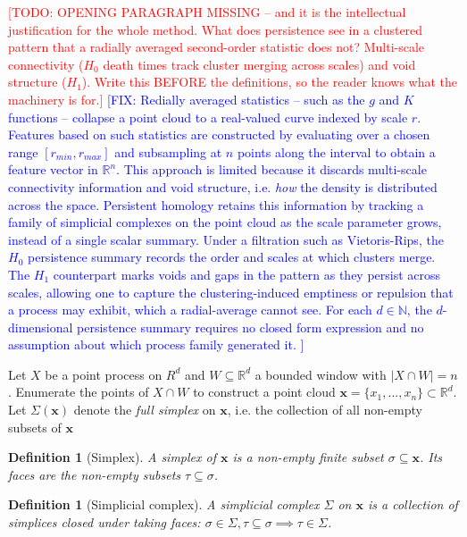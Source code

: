 \documentclass[11pt,letterpaper]{article}
\newcommand{\R}{\mathbb{R}}
\newcommand{\N}{\mathbb{N}}
\newcommand{\1}{\mathds{1}}
\newcommand{\pc}{\mathbf{x}}
\newcommand{\simpcom}{\Sigma}
\newcommand{\todo}[1]{\textcolor{red}{[TODO: #1]}}
\newcommand{\fix}[1]{\textcolor{blue}{[FIX: #1]}}
\newcommand{\todo}[1]{}
\newcommand{\fix}[1]{}
\theoremstyle{plain}
\theoremstyle{definitioncolon}
\newtheorem{definition}[theorem]{Definition}
\begin{document}
\todo{OPENING PARAGRAPH MISSING -- and it is the intellectual justification for
the whole method. What does persistence see in a clustered pattern that a
radially averaged second-order statistic does not? Multi-scale connectivity
($H_0$ death times track cluster merging across scales) and void structure
($H_1$). Write this BEFORE the definitions, so the reader knows what the
machinery is for.}
\fix{Redially averaged statistics -- such as the $g$ and $K$ functions -- collapse
a point cloud to a real-valued curve indexed by scale $r$. Features based on such
statistics are constructed by evaluating over a chosen range $[r_{min}, r_{max}]$
and subsampling at $n$ points along the interval to obtain a feature vector in $\R^n$.
This approach is limited because it discards multi-scale connectivity information and
void structure, i.e. \emph{how} the density is distributed across the space.
Persistent homology retains this information by tracking a family of simplicial
complexes on the point cloud as the scale parameter grows, instead of a single scalar
summary. Under a filtration such as Vietoris-Rips, the $H_0$ persistence summary records
the order and scales at which clusters merge. The $H_1$ counterpart marks voids and gaps
in the pattern as they persist across scales, allowing one to capture the clustering-induced
emptiness or repulsion that a process may exhibit, which a radial-average cannot see.
For each $d \in \N$, the $d$-dimensional persistence summary requires no closed form expression
and no assumption about which process family generated it.
}

Let $X$ be a point process on $R^d$ and $W \subseteq \R^d$ a bounded window with
$|X \cap W| = n$ . Enumerate the points of $X \cap W$ to construct a point cloud
$\pc = \{x_1, ..., x_n\} \subset \R^d$. Let $\Sigma(\pc)$ denote the \emph{full
simplex} on $\pc$, i.e. the collection of all non-empty subsets of $\pc$

    \begin{definition}[Simplex]
        A \emph{simplex} of $\pc$ is a non-empty finite subset
        $\sigma \subseteq \pc$. Its faces are the non-empty subsets
        $\tau \subseteq \sigma$.
    \end{definition}

    \begin{definition}[Simplicial complex]
        A simplicial complex $\simpcom$ on $\pc$ is a collection of simplices
        closed under taking faces: $\sigma \in \simpcom, \tau \subseteq \sigma
        \implies \tau \in \simpcom$.
    \end{definition}
\end{document}
